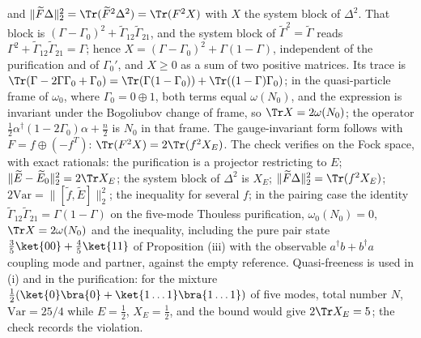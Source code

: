 and $\|\widetilde F\Delta\|_{2}^{2} = \Tr(\widetilde F^{2}\Delta^{2}) = \Tr(F^{2}X)$ with $X$ the system block of $\Delta^{2}$. That block is $(\Gamma - \Gamma_{0})^{2} + \widetilde\Gamma_{12}\widetilde\Gamma_{21}$, and the system block of $\widetilde\Gamma^{2} = \widetilde\Gamma$ reads $\Gamma^{2} + \widetilde\Gamma_{12}\widetilde\Gamma_{21} = \Gamma$; hence $X = (\Gamma - \Gamma_{0})^{2} + \Gamma(1 - \Gamma)$, independent of the purification and of $\Gamma_{0}'$, and $X \ge 0$ as a sum of two positive matrices. Its trace is $\Tr(\Gamma - 2\Gamma\Gamma_{0} + \Gamma_{0}) = \Tr(\Gamma(1 - \Gamma_{0})) + \Tr((1 - \Gamma)\Gamma_{0})$; in the quasi-particle frame of $\omega_{0}$, where $\Gamma_{0} = 0 \oplus 1$, both terms equal $\omega(N_{0})$, and the expression is invariant under the Bogoliubov change of frame, so $\Tr X = 2\omega(N_{0})$; the operator $\tfrac12\alpha^{\dagger}(1 - 2\Gamma_{0})\alpha + \tfrac n2$ is $N_{0}$ in that frame. The gauge-invariant form follows with $F = f \oplus (-f^{T})$: $\Tr(F^{2}X) = 2\Tr(f^{2}X_{E})$. The check verifies on the Fock space, with exact rationals: the purification is a projector restricting to $E$; $\|\widetilde E - \widetilde E_{0}\|_{2}^{2} = 2\Tr X_{E}$; the system block of $\Delta^{2}$ is $X_{E}$; $\|\widetilde F\Delta\|_{2}^{2} = \Tr(f^{2}X_{E})$; $2\mathrm{Var} = \|[\widetilde f, \widetilde E]\|_{2}^{2}$; the inequality for several $f$; in the pairing case the identity $\widetilde\Gamma_{12}\widetilde\Gamma_{21} = \Gamma(1 - \Gamma)$ on the five-mode Thouless purification, $\omega_{0}(N_{0}) = 0$, $\Tr X = 2\omega(N_{0})$ and the inequality, including the pure pair state $\tfrac35\ket{00} + \tfrac45\ket{11}$ of Proposition (iii) with the observable $a^{\dagger}b + b^{\dagger}a$ coupling mode and partner, against the empty reference. Quasi-freeness is used in (i) and in the purification: for the mixture $\tfrac12(\ket{0}\bra{0} + \ket{1\dots1}\bra{1\dots1})$ of five modes, total number $N$, $\mathrm{Var} = 25/4$ while $E = \tfrac12$, $X_{E} = \tfrac12$, and the bound would give $2\Tr X_{E} = 5$; the check records the violation.


